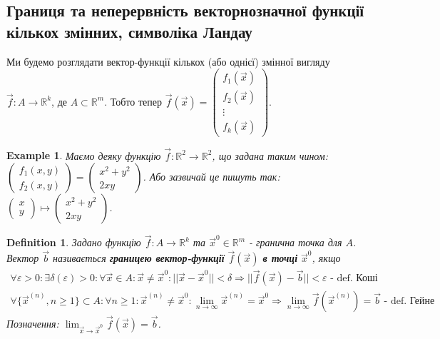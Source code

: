 \documentclass[a4paper, 10pt]{article}
\def\huge{\displaystyle}
\theoremstyle{theoremdd}
\theoremstyle{theoremdd}
\theoremstyle{theoremdd}
\newtheorem{definition}[theorem]{Definition}
\theoremstyle{theoremdd}
\theoremstyle{theoremdd}
\newtheorem{example}[theorem]{Example}
\theoremstyle{theoremdd}
\theoremstyle{theoremdd}
\theoremstyle{theoremdd}
\theoremstyle{theoremdd}
\begin{document}
\newpage

\subsection{Границя та неперервність векторнозначної функції кількох змінних, символіка Ландау}
Ми будемо розглядати вектор-функції кількох (або однієї) змінної вигляду $\vec{f}: A \to \mathbb{R}^k$, де $A \subset \mathbb{R}^m$. Тобто тепер $\vec{f}(\vec{x}) = \begin{pmatrix}
f_1(\vec{x}) \\ f_2(\vec{x}) \\ \vdots \\ f_k(\vec{x})
\end{pmatrix}$.

\begin{example}
Маємо деяку функцію $\vec{f}: \mathbb{R}^2 \to \mathbb{R}^2$, що задана таким чином:\\
$\begin{pmatrix}
f_1(x,y) \\
f_2(x,y)
\end{pmatrix} = \begin{pmatrix}
x^2 + y^2 \\ 2xy
\end{pmatrix}$. Або зазвичай це пишуть так: $\begin{pmatrix}
x \\ y
\end{pmatrix} \mapsto \begin{pmatrix}
x^2+y^2 \\ 2xy
\end{pmatrix}$.
\end{example}

\begin{definition}
Задано функцію $\vec{f}: A \to \mathbb{R}^k$ та $\vec{x}^0 \in \mathbb{R}^m$ - гранична точка для $A$.\\
Вектор $\vec{b}$ називається \textbf{границею вектор-функції} $\vec{f}(\vec{x})$ \textbf{в точці} $\vec{x}^0$, якщо
\begin{align*}
\forall \varepsilon > 0: \exists \delta(\varepsilon) > 0: \forall \vec{x} \in A: \vec{x} \neq \vec{x}^0: ||\vec{x} - \vec{x}^0 || < \delta \Rightarrow ||\vec{f}(\vec{x}) - \vec{b}|| < \varepsilon \textrm{ - def. Коші}\\
\forall \{\vec{x}^{(n)}, n \geq 1\} \subset A: \forall n \geq 1: \vec{x}^{(n)} \neq \vec{x}^0: \huge \lim_{n \to \infty} \vec{x}^{(n)} = \vec{x}^0 \Rightarrow \lim_{n \to \infty} \vec{f}(\vec{x}^{(n)}) = \vec{b} \textrm{ - def. Гейне}
\end{align*}
Позначення: $\huge \lim_{\vec{x} \to \vec{x}^0} \vec{f}(\vec{x}) = \vec{b}$.
\end{definition}
\end{document}
